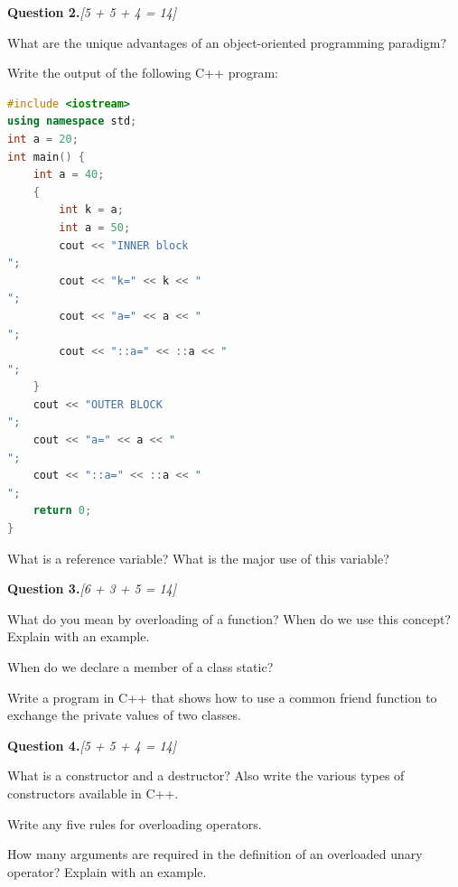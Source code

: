 \documentclass[11pt,a4paper]{article}
\newcommand{\pts}[1]{\hfill   \textit{[#1]}}
\begin{document}
\bigskip


\noindent   \textbf{Question 2.}\pts{5 + 5 + 4 = 14}

\begin{parts}
  \item What are the unique advantages of an object-oriented programming paradigm?
  \item Write the output of the following C++ program:

\begin{lstlisting}[language=C++]
#include <iostream>
using namespace std;
int a = 20;
int main() {
    int a = 40;
    {
        int k = a;
        int a = 50;
        cout << "INNER block
";
        cout << "k=" << k << "
";
        cout << "a=" << a << "
";
        cout << "::a=" << ::a << "
";
    }
    cout << "OUTER BLOCK
";
    cout << "a=" << a << "
";
    cout << "::a=" << ::a << "
";
    return 0;
}
\end{lstlisting}
  \item What is a reference variable? What is the major use of this variable?
\end{parts}

\bigskip


\noindent   \textbf{Question 3.}\pts{6 + 3 + 5 = 14}

\begin{parts}
  \item What do you mean by overloading of a function? When do we use this concept? Explain with an example.
  \item When do we declare a member of a class static?
  \item Write a program in C++ that shows how to use a common friend function to exchange the private values of two classes.
\end{parts}

\bigskip


\noindent   \textbf{Question 4.}\pts{5 + 5 + 4 = 14}

\begin{parts}
  \item What is a constructor and a destructor? Also write the various types of constructors available in C++.
  \item Write any five rules for overloading operators.
  \item How many arguments are required in the definition of an overloaded unary operator? Explain with an example.
\end{parts}

\bigskip
\end{document}
